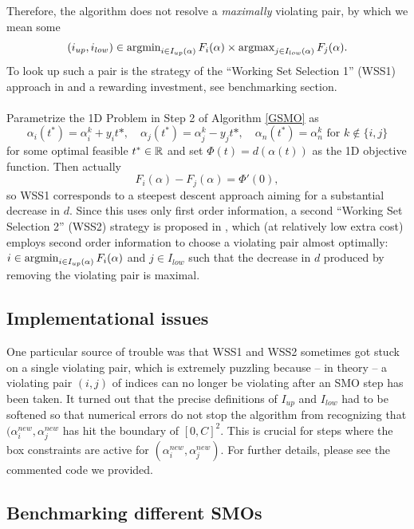 Therefore, the algorithm does not resolve a \textit{maximally} violating pair, by which we mean some 
\[
(i_{up},i_{low}) \in \operatorname{argmin}_{i \in I_{up}(\alpha)}F_i(\alpha) \times \operatorname{argmax}_{j \in I_{low}(\alpha)}F_j(\alpha).
\] To look up such a pair is the strategy of the ``Working Set Selection 1'' (WSS1) approach in \cite{FanChenLin} and a rewarding investment, see benchmarking section. \\\\
Parametrize the 1D Problem in Step 2 of Algorithm \ref{GSMO} as
\[
\alpha_i(t^*) = \alpha^k_i + y_i t*, \quad \alpha_j(t^*) = \alpha^k_j - y_j t*, \quad \alpha_n(t^*) = \alpha^k_n \text{ for } k \notin \{i,j\}
\]
for some optimal feasible $t^* \in \mathbb{R}$ and set $\Phi(t) = d(\alpha(t))$ as the 1D objective function. Then actually
\begin{equation*}
F_i(\alpha) - F_j(\alpha) = \Phi'(0),
\end{equation*}
so WSS1 corresponds to a steepest descent approach aiming for a substantial decrease in $d$. Since this uses only first order information, a second ``Working Set Selection 2'' (WSS2) strategy is proposed in \cite{FanChenLin}, which (at relatively low extra cost) employs second order information to choose a violating pair almost optimally: $i \in \operatorname{argmin}_{i \in I_{up}(\alpha)}F_i(\alpha)$ and $j \in I_{low}$ such that the decrease in $d$ produced by removing the violating pair is maximal.

\subsection{Implementational issues}
One particular source of trouble was that WSS1 and WSS2 sometimes got stuck on a single violating pair, which is extremely puzzling because -- in theory -- a violating pair $(i,j)$ of indices can no longer be violating after an SMO step has been taken. It turned out that the precise definitions of $I_{up}$ and $I_{low}$ had to be softened so that numerical errors do not stop the algorithm from recognizing that $(\alpha^{new}_i,\alpha^{new}_j$ has hit the boundary of $[0,C]^2$. This is crucial for steps where the box constraints are active for $(\alpha^{new}_i,\alpha^{new}_j)$. For further details, please see the commented code we provided. 
\subsection{Benchmarking different SMOs}

